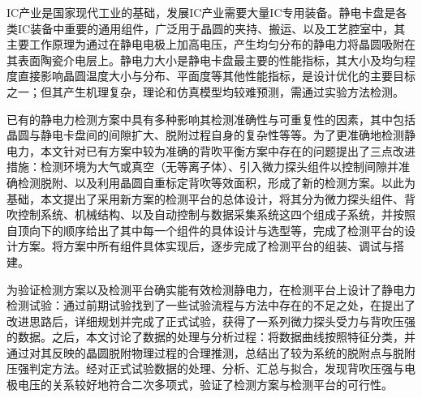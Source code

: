 
\makeatletter
\ifthu@bachelor\relax\else
  \ifthu@doctor
  \else
    \ifthu@master
    \fi
  \fi
\fi
\makeatother




\begin{cabstract}
IC产业是国家现代工业的基础，发展IC产业需要大量IC专用装备。静电卡盘是各类IC装备中重要的通用组件，广泛用于晶圆的夹持、搬运、以及工艺腔室中，其主要工作原理为通过在静电电极上加高电压，产生均匀分布的静电力将晶圆吸附在其表面陶瓷介电层上。静电力大小是静电卡盘最主要的性能指标，其大小及均匀程度直接影响晶圆温度大小与分布、平面度等其他性能指标，是设计优化的主要目标之一；但其产生机理复杂，理论和仿真模型均较难预测，需通过实验方法检测。

已有的静电力检测方案中具有多种影响其检测准确性与可重复性的因素，其中包括晶圆与静电卡盘间的间隙扩大、脱附过程自身的复杂性等等。为了更准确地检测静电力，本文针对已有方案中较为准确的背吹平衡方案中存在的问题提出了三点改进措施：检测环境为大气或真空（无等离子体）、引入微力探头组件以控制间隙并准确检测脱附、以及利用晶圆自重标定背吹等效面积，形成了新的检测方案。以此为基础，本文提出了采用新方案的检测平台的总体设计，将其分为微力探头组件、背吹控制系统、机械结构、以及自动控制与数据采集系统这四个组成子系统，并按照自顶向下的顺序给出了其中每一个组件的具体设计与选型等，完成了检测平台的设计方案。将方案中所有组件具体实现后，逐步完成了检测平台的组装、调试与搭建。

为验证检测方案以及检测平台确实能有效检测静电力，在检测平台上设计了静电力检测试验：通过前期试验找到了一些试验流程与方法中存在的不足之处，在提出了改进思路后，详细规划并完成了正式试验，获得了一系列微力探头受力与背吹压强的数据。之后，本文讨论了数据的处理与分析过程：将数据曲线按照特征分类，并通过对其反映的晶圆脱附物理过程的合理推测，总结出了较为系统的脱附点与脱附压强判定方法。经对正式试验数据的处理、分析、汇总与拟合，发现背吹压强与电极电压的关系较好地符合二次多项式，验证了检测方案与检测平台的可行性。
\end{cabstract}



